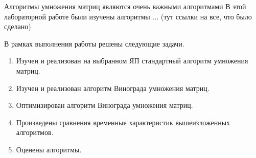 \Conclusion %

Алгоритмы умножения матриц являют­ся очень важными алгоритмами
В этой лабораторной работе были изучены алгоритмы ... (тут ссылки на все, что было сделано)

В рамках выполнения работы решены следующие задачи.

\begin{enumerate}
	\item Изучен и реализован на выбранном ЯП стандартный алгоритм умножения матриц.
	\item Изучен и реализован алгоритм Винограда умножения матриц.
	\item Оптимизирован алгоритм Винограда умножения матриц.
	\item Произведены сравнения временные характеристик вышеизложенных алгоритмов.
	\item Оценены алгоритмы.
\end{enumerate}